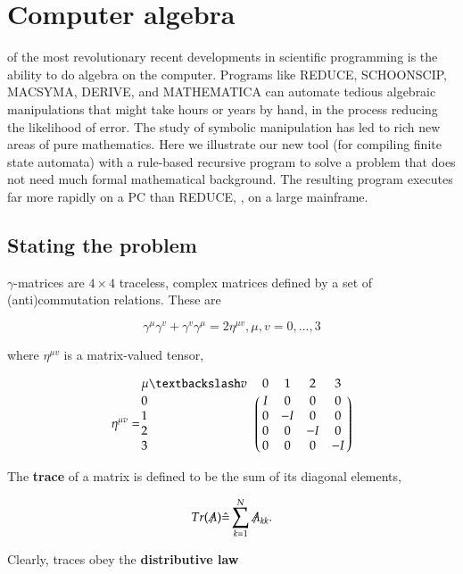 \section{Computer algebra}
 of the most revolutionary recent developments in scientific  programming is the ability to do algebra on the computer. Programs like REDUCE, SCHOONSCIP, MACSYMA, DERIVE, and MATHEMATICA can automate tedious algebraic manipulations that might take hours or years by hand, in the process reducing the likelihood of error. The study of symbolic manipulation has led to rich new areas of pure mathematics. Here we illustrate our new tool (for compiling finite state automata) with a rule-based recursive program to solve a problem that does not need much formal mathematical background. The resulting program executes far more rapidly on a PC than REDUCE, \eg, on a large mainframe.

\subsection{Stating the problem}
 $\gamma$-matrices are $4 \times 4$ traceless, complex matrices defined by a set of (anti)commutation relations. These are

\begin{equation} \label{eq:11_01}
\gamma^{\mu}\gamma^{v} + \gamma^{v}\gamma^{\mu} = 2 \eta^{\mu v}, \mu, v = 0,..., 3
\end{equation}

where $\eta^{\mu v}$ is a matrix-valued tensor,

\begin{equation}\label{eq:11_02}
    \eta^{\mu v} =
    \bordermatrix{
        \mu \textbackslash v & 0 &  1 &  2 &  3 \cr
        0 & I &  0 &  0 &  0 \cr
        1 & 0 & -I &  0 &  0 \cr
        2 & 0 &  0 & -I &  0 \cr
        3 & 0 &  0 &  0 & -I \cr
        }
\end{equation}

The \textbf{trace} of a matrix is defined to be the sum of its diagonal elements,

\begin{equation}\label{eq:11_03}
 Tr(\tr{A})\hat{=}\sum_{k=1}^{N}\tr{A}_{kk} .
\end{equation}

Clearly, traces obey the \textbf{distributive law}


